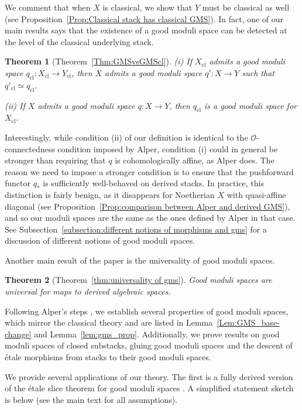 \documentclass[a4paper,twoside,11pt]{amsart}
\theoremstyle{plain}
\newtheorem*{theorem*}{Theorem}
\theoremstyle{definition}
\theoremstyle{remark}
\numberwithin{equation}{section}
\newcommand{\cl}{\mathrm{cl}} %
\newcommand{\oO}{\mathcal{O}}
\begin{document}
We comment that when $X$ is classical, we show that $Y$ must be classical as well (see Proposition~\ref{Prop:Classical stack has classical GMS}). In fact, one of our main results says that the existence of a good moduli space can be detected at the level of the classical underlying stack.

\begin{theorem*} [Theorem~\ref{Thm:GMSvsGMScl}]
(i) If $X_\cl$ admits a good moduli space $q_\cl \colon X_\cl \to Y_\cl$, then $X$ admits a good moduli space $q' \colon X \to Y$ such that $q'_\cl \simeq q_\cl$.

(ii) If $X$ admits a good moduli space $q\colon X \to Y$, then $q_\cl$ is a good moduli space for $X_\cl$.
\end{theorem*}


Interestingly, while condition (ii) of our definition is identical to the $\oO$-connectedness condition imposed by Alper, condition (i) could in general be stronger than requiring that $q$ is cohomologically affine, as Alper does. The reason we need to impose a stronger condition is to ensure that the pushforward 
functor $q_\ast$ is sufficiently well-behaved on derived stacks. In practice, this distinction is fairly benign, as it disappears for Noetherian $X$ with quasi-affine diagonal (see Proposition~\ref{Prop:comparison between Alper and derived GMS}), and so our moduli spaces are the same as the ones defined by Alper in that case. See Subsection~\ref{subsection:different notions of morphisms and gms} for a discussion of different notions of good moduli spaces.

Another main result of the paper is the universality of good moduli spaces.

\begin{theorem*}[Theorem~\ref{thm:universality of gms}]
Good moduli spaces are universal for maps to derived algebraic spaces.
\end{theorem*}

Following Alper's steps \cite{AlperGood}, we establish several properties of good moduli spaces, which mirror the classical theory and are listed in Lemma~\ref{Lem:GMS_base-change} and Lemma~\ref{lem:gms_prop}. Additionally, we prove results on good moduli spaces of closed substacks, gluing good moduli spaces and the descent of \'{e}tale morphisms from stacks to their good moduli spaces.
\smallskip

We provide several applications of our theory. The first is a fully derived version of the \'{e}tale slice theorem for good moduli spaces \cite{AlperLuna}. A simplified statement sketch is below (see the main text for all assumptions).
\end{document}
